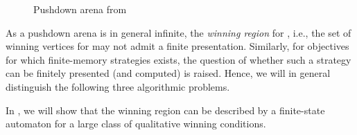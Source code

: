 \begin{example}
\begin{figure}[htb]
\begin{center}
\end{center}
\caption{Pushdown arena from }
\label{10-fig:example-pushdown-game-1}
\end{figure}

\end{example}


As a pushdown arena is in general infinite, the \emph{winning region} for \Eve, i.e., the set of winning vertices for \Eve may not admit a finite presentation. Similarly, for objectives for which finite-memory strategies exists, the question of whether such a strategy can be finitely presented (and computed) is raised. Hence, we will in general distinguish the following three algorithmic problems.



In , we will show that the winning region can be described by a finite-state automaton  for a large class of qualitative winning conditions.


